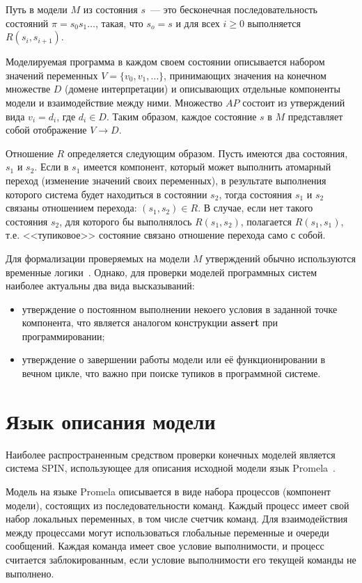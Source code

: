 \documentclass[12pt,a4paper,article]{bpm2}
\begin{document}
Путь в модели $M$ из состояния $s$~--- это бесконечная последовательность состояний $\pi = s_0 s_1 \ldots$, такая, что
$s_o = s$ и для всех $i \geq 0$ выполняется $R(s_i, s_{i+1})$.

Моделируемая программа в каждом своем состоянии описывается набором значений переменных $V = \{v_0, v_1, \ldots\}$, принимающих значения на конечном множестве $D$ (домене интерпретации) и описывающих отдельные компоненты модели и взаимодействие между ними.
Множество $AP$ состоит из утверждений вида $v_i = d_i$, где $d_i \in D$.
Таким образом, каждое состояние $s$ в $M$ представляет собой отображение $V \rightarrow D$.

Отношение $R$ определяется следующим образом. Пусть имеются два состояния, $s_1$ и $s_2$. Если в $s_1$ имеется
компонент, который может выполнить атомарный переход (изменение значений своих переменных), в результате выполнения
которого система будет находиться в состоянии $s_2$, тогда состояния $s_1$ и $s_2$ связаны отношением перехода: $(s_1,
s_2) \in R$. В случае, если нет такого состояния $s_2$, для которого бы выполнялось $R(s_1, s_2)$, полагается $R(s_1,
s_1)$, т.е. <<тупиковое>> состояние связано отношение перехода само с собой.

Для формализации проверяемых на модели $M$ утверждений обычно используются временные логики~\cite{Clarke}.
Однако, для проверки моделей программных систем наиболее актуальны два вида высказываний:
\begin{itemize}
\item утверждение о постоянном выполнении некоего условия в заданной точке компонента, что является аналогом конструкции \textbf{assert} при программировании;
\item утверждение о завершении работы модели или её функционировании в вечном цикле, что важно при поиске тупиков в программной системе.
\end{itemize}

\section{Язык описания модели}
\label{sec:spin}

Наиболее распространенным средством проверки конечных моделей является система SPIN, использующее для описания исходной
модели язык Promela~\cite{SPIN}.

Модель на языке Promela описывается в виде набора процессов (компонент модели), состоящих из последовательности команд.
Каждый процесс имеет свой набор локальных переменных, в том числе счетчик команд.
Для взаимодействия между процессами могут использоваться глобальные переменные и очереди сообщений.
Каждая команда имеет свое условие выполнимости, и процесс считается заблокированным, если условие выполнимости его текущей команды не выполнено.
\end{document}
